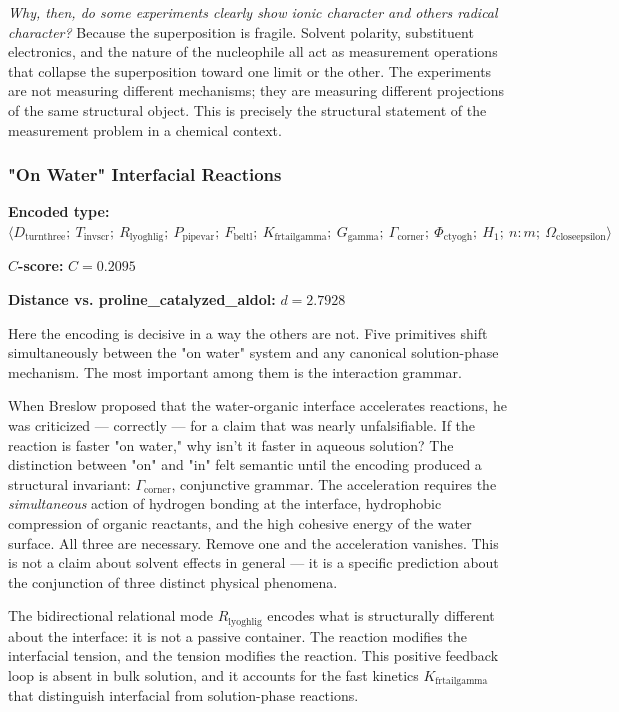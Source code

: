 \documentclass[12pt,a4paper]{article}
\begin{document}
\emph{Why, then, do some experiments clearly show ionic character and others radical character?} Because the superposition is fragile. Solvent polarity, substituent electronics, and the nature of the nucleophile all act as measurement operations that collapse the superposition toward one limit or the other. The experiments are not measuring different mechanisms; they are measuring different projections of the same structural object. This is precisely the structural statement of the measurement problem in a chemical context.

\subsubsection{"On Water" Interfacial Reactions}

\textbf{Encoded type:} $\langle D_{\text{turnthree}};\ T_{\text{invscr}};\ R_{\text{lyoghlig}};\ P_{\text{pipevar}};\ F_{\text{beltl}};\ K_{\text{frtailgamma}};\ G_{\text{gamma}};\ \Gamma_{\text{corner}};\ \Phi_{\text{ctyogh}};\ H_1;\ n{:}m;\ \Omega_{\text{closeepsilon}} \rangle$

\textbf{$C$-score:} $C = 0.2095$

\textbf{Distance vs. proline\_catalyzed\_aldol:} $d = 2.7928$

Here the encoding is decisive in a way the others are not. Five primitives shift simultaneously between the "on water" system and any canonical solution-phase mechanism. The most important among them is the interaction grammar.

When Breslow proposed that the water-organic interface accelerates reactions, he was criticized --- correctly --- for a claim that was nearly unfalsifiable. If the reaction is faster "on water," why isn't it faster in aqueous solution? The distinction between "on" and "in" felt semantic until the encoding produced a structural invariant: $\Gamma_{\text{corner}}$, conjunctive grammar. The acceleration requires the \emph{simultaneous} action of hydrogen bonding at the interface, hydrophobic compression of organic reactants, and the high cohesive energy of the water surface. All three are necessary. Remove one and the acceleration vanishes. This is not a claim about solvent effects in general --- it is a specific prediction about the conjunction of three distinct physical phenomena.

The bidirectional relational mode $R_{\text{lyoghlig}}$ encodes what is structurally different about the interface: it is not a passive container. The reaction modifies the interfacial tension, and the tension modifies the reaction. This positive feedback loop is absent in bulk solution, and it accounts for the fast kinetics $K_{\text{frtailgamma}}$ that distinguish interfacial from solution-phase reactions.
\end{document}
